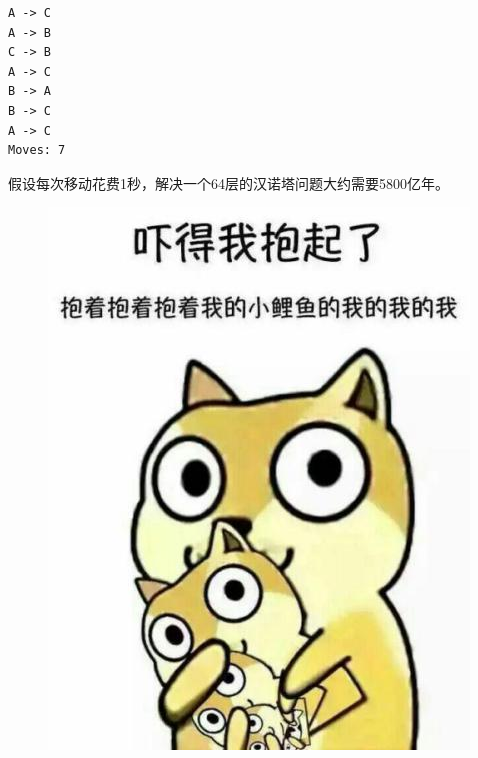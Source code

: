 \begin{tcolorbox}
	\begin{verbatim}
A -> C
A -> B
C -> B
A -> C
B -> A
B -> C
A -> C
Moves: 7
	\end{verbatim}
\end{tcolorbox}

假设每次移动花费1秒，解决一个64层的汉诺塔问题大约需要5800亿年。\\

\begin{figure}[H]
	\centering
	\includegraphics[]{img/Chapter5/5-3/2.png}
\end{figure}

\newpage